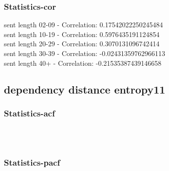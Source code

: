 \documentclass{article}%
\begin{document}
%
\newpage%
\subsubsection{Statistics{-}cor}%
\label{ssubsec:Statistics{-}cor}%
\noindent%
sent length 02-09 - Correlation: 0.17542022250245484\\%
sent length 10-19 - Correlation: 0.5976435191124854\\%
sent length 20-29 - Correlation: 0.3070131096742414\\%
sent length 30-39 - Correlation: -0.02431359762966113\\%
sent length 40+ - Correlation: -0.21535387439146658\\

%
\newpage

%
\subsection{dependency distance entropy11}%
\label{subsec:dependencydistanceentropy11}%
\subsubsection{Statistics{-}acf}%
\label{ssubsec:Statistics{-}acf}%


\begin{figure}[ht]%
\centering%
\setlength{\abovecaptionskip}{-35pt}%
%
%
\\%
%
%
\\%
%
\end{figure}

%
\newpage%
\subsubsection{Statistics{-}pacf}%
\label{ssubsec:Statistics{-}pacf}%
\end{document}
